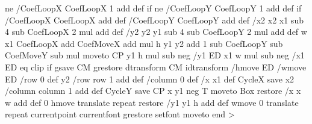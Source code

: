     \psk@fillsepx{} ne {/CoefLoopX CoefLoopX 1 add def} if
    \psk@fillsepy{} ne {/CoefLoopY CoefLoopY 1 add def} if
    /CoefLoopX CoefLoopX \psk@fillloopaddx\space add def
    /CoefLoopY CoefLoopY \psk@fillloopaddy\space add def
    /x2 x2 x1 sub 4 sub CoefLoopX 2 mul add def
    /y2 y2 y1 sub 4 sub CoefLoopY 2 mul add def
    w x1 CoefLoopX add CoefMoveX add mul
      h y1 y2 add 1 sub CoefLoopY sub CoefMoveY sub mul moveto
    CP 
    y1 h mul sub neg /y1 ED
    x1 w mul sub neg /x1 ED
     eq {clip} if
    \psk@fillmovex\space \psk@fillmovey
    gsave \tx@STV CM grestore 
    dtransform CM idtransform
    /hmove ED /wmove ED
    /row 0 def
    y2 {
       /row row 1 add def
       /column 0 def
       /x x1 def
       CycleX
       save
       x2 {
          /column column 1 add def
          CycleY
          save CP x y1 
          \ifPSTlualatex neg \fi
          T moveto Box restore
          /x x w add def
          0 hmove translate
          } repeat
       restore
       /y1 y1 h add def
       wmove 0 translate
    } repeat
    currentpoint 
    currentfont 
    grestore 
    setfont 
    moveto
    \ifPSTlualatex end \fi
  >
\fi %

